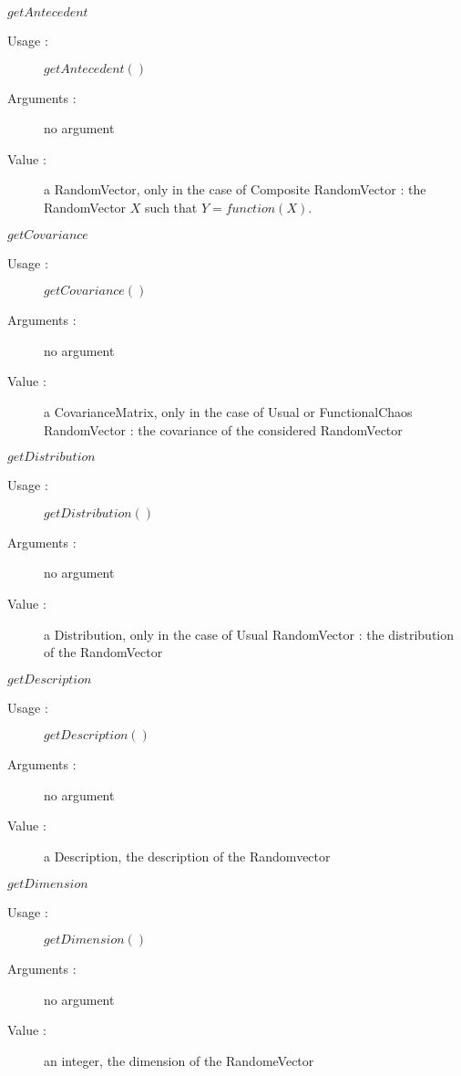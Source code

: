 \begin{description}
\item[Some methods :]  \rule{0pt}{1em}
  \begin{description}
  \item $getAntecedent$
    \begin{description}
    \item[Usage :] $getAntecedent()$
    \item[Arguments :] no argument
    \item[Value :] a RandomVector, only in the case of Composite RandomVector : the  RandomVector $X$ such that $Y=function(X)$.
    \end{description}
    \bigskip
  \item $getCovariance$
    \begin{description}
    \item[Usage :] $getCovariance()$
    \item[Arguments :] no argument
    \item[Value :] a CovarianceMatrix, only in the case of Usual or FunctionalChaos RandomVector : the covariance of the  considered RandomVector
    \end{description}
    \bigskip

  \item $getDistribution$
    \begin{description}
    \item[Usage :] $getDistribution()$
    \item[Arguments :] no argument
    \item[Value :] a Distribution, only in the case of Usual RandomVector : the distribution of the RandomVector
    \end{description}
    \bigskip

  \item $getDescription$
    \begin{description}
    \item[Usage :] $getDescription()$
    \item[Arguments :] no argument
    \item[Value :] a Description, the description of the Randomvector
    \end{description}
    \bigskip

  \item $getDimension$
    \begin{description}
    \item[Usage :] $getDimension()$
    \item[Arguments :] no argument
    \item[Value :] an integer, the dimension of the RandomeVector
    \end{description}
    \bigskip


\end{description}
\end{description}
